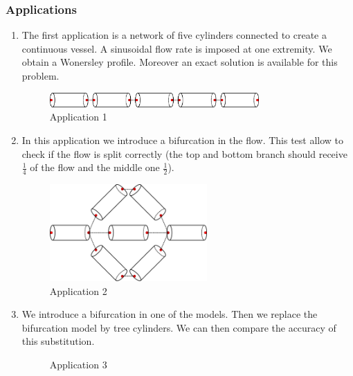 \documentclass[11pt]{article}
\begin{document}
\subsubsection{Applications}
\begin{enumerate}
\item The first application is a network of five cylinders connected to create a continuous vessel. A sinusoidal flow rate is imposed at one extremity. We obtain a Wonersley profile. Moreover an exact solution is available for this  problem.
\begin{figure}[H]
\begin{center}
\includegraphics[width=8cm]{images/multiscale/application1.pdf}
\caption{Application 1}
\label{fig:multiscaleApplication1}
\end{center}
\end{figure}


\item In this application we introduce a bifurcation in the flow. This test allow to check if the flow is split correctly (the top and bottom branch should receive $\frac{1}{4}$ of the flow and the middle one $\frac{1}{2}$).
\begin{figure}[H]
\begin{center}
\includegraphics[width=6cm]{images/multiscale/application2.pdf}
\caption{Application 2}
\label{fig:multiscaleApplication2}
\end{center}
\end{figure}

\item We introduce a bifurcation in one of the models. Then we replace the bifurcation model by tree cylinders. We can then compare the accuracy of this substitution.

\begin{figure}[H]
\centering
{}
\caption{Application 3}
\label{fig:multiscaleApplication3}
\end{figure}

\end{enumerate}
\end{document}
